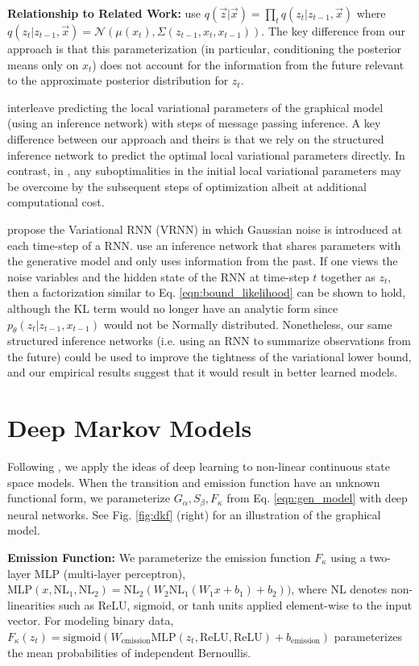 \documentclass[letterpaper]{article}
\newcommand{\pth}{p_\theta}
\newcommand{\meanfxn}{\textit{G}_{\alpha}}
\newcommand{\covfxn}{\textit{S}_{\beta}}
\newcommand{\emisfxn}{\textit{F}_{\kappa}}
\theoremstyle{plain}
\newcommand{\MLP}{\text{MLP}}
\newcommand{\ReLU}{\text{ReLU}}
\newcommand{\Sigmoid}{\text{sigmoid}}
\begin{document}
\textbf{Relationship to Related Work: }
\citeauthor{archer2015black,gao2016linear} use $q(\vec{z}|\vec{x}) = \prod_t q(z_t|z_{t-1},\vec{x})$ where $q(z_t|z_{t-1},\vec{x}) = \mathcal{N}\left(\mu(x_t),\Sigma(z_{t-1},x_t,x_{t-1})\right)$. 
The key difference from our approach is that this parameterization (in particular, conditioning the posterior means only on $x_t$) does not account for the information
from the future relevant to the approximate posterior distribution for $z_t$. 

\citeauthor{johnson2016structured} 
interleave predicting the local variational parameters of the graphical model (using an inference network) with steps of message passing inference.
A key difference between our approach and theirs is that we rely on the structured inference network to predict the optimal local variational parameters
directly. In contrast, in \citeauthor{johnson2016structured}, any suboptimalities 
in the initial local variational parameters may be overcome by the subsequent steps of optimization 
albeit at additional computational cost. 

\citeauthor{chung2015recurrent} propose the Variational RNN (VRNN) in
which Gaussian noise is introduced at each time-step of a RNN.
\citeauthor{chung2015recurrent} use an inference network that shares
parameters with the generative model and only uses information from
the past. If one views the noise variables and the hidden state of the
RNN at time-step $t$ together as $z_t$, then a factorization similar
to Eq. \ref{eqn:bound_likelihood} can be shown to hold, although the
KL term would no longer have an analytic form since $\pth(z_t|z_{t-1},
x_{t-1})$ would not be Normally distributed. Nonetheless, our same
structured inference networks (i.e. using an RNN to summarize
observations from the future) could be used to improve the tightness
of the variational lower bound, and our empirical results suggest that
it would result in better learned models.
 \section{Deep Markov Models}
Following \cite{Raiko2006}, we apply the ideas of deep learning to non-linear continuous state space models.
When the transition and emission function have an unknown functional form, we 
parameterize $\meanfxn,\covfxn,\emisfxn$ from Eq. \ref{eqn:gen_model}
with deep neural networks. See Fig. \ref{fig:dkf} (right) for an illustration of the graphical model.  

{\bf Emission Function:} 
We parameterize the emission function $\emisfxn$ using a two-layer MLP (multi-layer perceptron),
$\text{MLP}(x, \text{NL}_1, \text{NL}_2) = \text{NL}_2 (W_2 \text{NL}_1(W_1x+b_1)+b_2))$,
where NL denotes non-linearities such as ReLU, sigmoid, or
tanh units applied element-wise to the input vector. 
For modeling binary data, $\emisfxn(z_t)
=\Sigmoid(W_{\text{emission}}\MLP(z_t,\ReLU,\ReLU)+b_{\text{emission}})$
parameterizes the mean probabilities of independent Bernoullis. 
\end{document}
